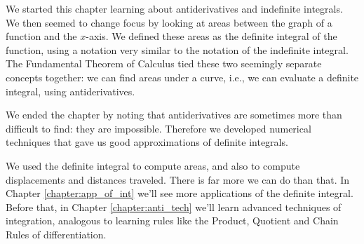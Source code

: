 We started this chapter learning about antiderivatives and indefinite integrals. We then seemed to change focus by looking at areas between the graph of a function and the $x$-axis. We defined these areas as the definite integral of the function, using a notation very similar to the notation of the indefinite integral. The Fundamental Theorem of Calculus tied these two seemingly separate concepts together: we can find areas under a curve, i.e., we can evaluate a definite integral, using antiderivatives. 

We ended the chapter by noting that antiderivatives are sometimes more than difficult to find: they are impossible. Therefore we developed numerical techniques that gave us good approximations of definite integrals.

We used the definite integral to compute areas, and also to compute displacements and distances traveled. There is far more we can do than that. In Chapter \ref{chapter:app_of_int} we'll see more applications of the definite integral. Before that, in Chapter \ref{chapter:anti_tech} we'll learn advanced techniques of integration, analogous to learning rules like the Product, Quotient and Chain Rules of differentiation. 

